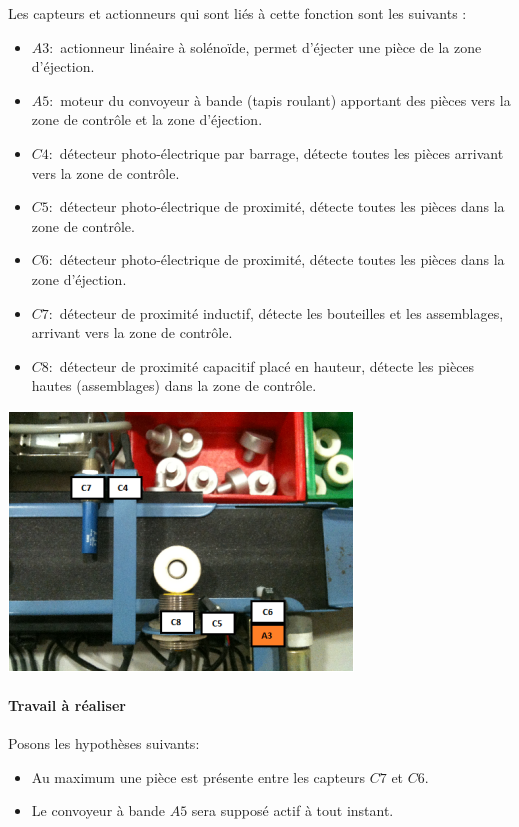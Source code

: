	Les capteurs et actionneurs qui sont liés à cette fonction sont les suivants :
	\begin{itemize} [label=,font=\small \color{black}]
	\item $A3 :$ actionneur linéaire à solénoïde, permet d’éjecter une pièce de la zone d’éjection.
	\item $A5 :$ moteur du convoyeur à bande (tapis roulant) apportant des pièces vers la zone de contrôle et la zone d’éjection.
	\item $C4 :$ détecteur photo-électrique par barrage, détecte toutes les pièces arrivant vers la zone de contrôle.
	\item $C5 :$ détecteur photo-électrique de proximité, détecte toutes les pièces dans la zone de contrôle.
	\item $C6 :$ détecteur photo-électrique de proximité, détecte toutes les pièces dans la zone d'éjection.
	\item $C7 :$ détecteur de proximité inductif, détecte les bouteilles et les assemblages, arrivant vers la zone de contrôle.
	\item $C8 :$ détecteur de proximité capacitif placé en hauteur, détecte les pièces hautes (assemblages) dans la zone de contrôle.
	\end{itemize}
	
	\begin{center}
	\includegraphics[scale=0.75]{zone.png}
	\label{fig1}
	\end{center}  

	\paragraph{Travail à réaliser\\}
		Posons les hypothèses suivants:
		\begin{itemize} [label=,font=\small \color{black}]
		\item Au maximum une pièce est présente entre les capteurs $C7$ et $C6$.
		\item Le convoyeur à bande $A5$ sera supposé actif à tout instant.
		\end{itemize}